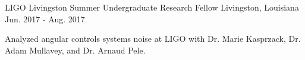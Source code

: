 \begin{cventries}
  \cventry
    {LIGO Livingston} %
    {Summer Undergraduate Research Fellow} %
    {Livingston, Louisiana} %
    {Jun. 2017 - Aug. 2017 } %
    {
      \begin{cvitems} %
        \item {Analyzed angular controls systems noise at LIGO with Dr. Marie Kasprzack, Dr. Adam Mullavey, and Dr. Arnaud Pele.}
      \end{cvitems}
    }


\end{cventries}
